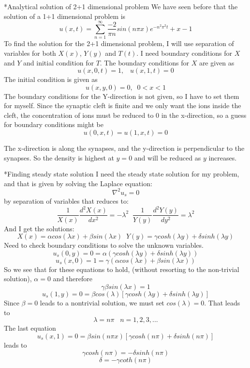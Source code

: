 \documentclass[a4paper, 12pt, titlepage]{article}
\newcommand{\f}[2]{\frac{#1}{#2}}
\newcommand{\beq}{\begin{equation*}}
\newcommand{\eeq}{\end{equation*}}
\newcommand{\beqq}{\begin{equation}}
\newcommand{\eeqq}{\end{equation}}
\begin{document}
\begin{section}
\begin{subsection}
  \end{subsection}

 \end{section}
    
 
 \begin{section}*{Analytical solution of 2+1 dimensional problem} 
  We have seen before that the solution of a 1+1 dimensional problem is 
  \beq u(x,t) = \sum_{n=1}^{\infty} \f{-2}{\pi n} sin(n\pi x) e^{-n^2\pi ^2 t} + x - 1 \eeq
  To find the solution for the 2+1 dimensional problem, I will use separation of variables for both
  $X(x)$, $Y(y)$ and $T(t)$. I need boundary conditions for $X$ and $Y$ and initial condition for $T$.
  The boundary conditions for $X$ are given as \beq u(x,0,t) = 1, \;\;\; u(x,1,t) = 0 \eeq
  The initial condition is given as
  \beq u(x,y,0) = 0, \;\; 0 < x < 1 \eeq
  The boundary conditions for the Y-direction is not given, so I have to set them for myself. Since the 
  synaptic cleft is finite and we only want the ions inside the cleft, the concentration of ions must
  be reduced to 0 in the x-direction, so a guess for boundary conditions might be 
  \beq u(0,x,t) = u(1,x,t) = 0 \eeq
  
  The x-direction is along the synapses, and the y-direction is perpendicular to the synapses. So the 
  density is highest at $y=0$ and will be reduced as $y$ increases. 
  \begin{subsection}*{Finding steady state solution}
  I need the steady state solution for my problem, and that is given by solving the Laplace equation:
  \beq \nabla ^2u_s = 0\eeq
  by separation of variables that reduces to:
  \beq \frac{1}{X(x)} \frac{d ^2 X(x)}{d x^2} = -\lambda ^2 \;\; \frac{1}{Y(y)} \frac{d^2Y(y)}{dy^2} = \lambda ^2\eeq
  And I get the solutions:
  \beq X(x) = \alpha cos(\lambda x) + \beta sin(\lambda x) \;\; Y(y) = \gamma cosh(\lambda y) + \delta sinh(\lambda y) \eeq
  Need to check boundary conditions to solve the unknown variables. 
  \beqq u_s(0,y) = 0 = \alpha(\gamma cosh(\lambda y) + \delta sinh(\lambda y)) \eeqq
  \beqq u_s(x,0) = 1 = \gamma(\alpha cos (\lambda x) + \beta  sin (\lambda x)) \eeqq
  So we see that for these equations to hold, (without resorting to the non-trivial solution), $\alpha = 0$ 
  and therefore \beq \gamma \beta sin(\lambda x) = 1 \eeq
  \beqq u_s(1,y) = 0 = \beta cos(\lambda) [\gamma cosh(\lambda y) + \delta sinh(\lambda y)] \eeqq
  Since $\beta = 0$ leads to a nontrivial solution, we must set $cos(\lambda) = 0$. That leads to 
  \beq \lambda = n\pi \;\;\; n = 1,2,3,... \eeq 
  The last equation 
  \beqq u_s(x,1) = 0 = \beta sin(n\pi x) [\gamma cosh(n\pi) + \delta sinh(n\pi)] \eeqq
  leads to \beq \gamma cosh(n\pi) = -\delta sinh(n\pi) \eeq
  \beq \delta = -\gamma coth(n\pi) \eeq 
  

\end{subsection}
\end{section}
\end{document}
